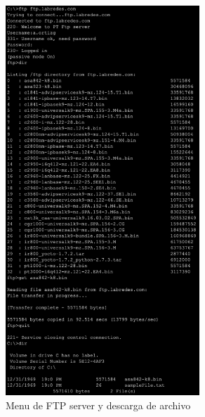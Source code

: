 \documentclass[10pt]{article}
\begin{document}
\begin{figure}[H]
    \centering
    \includegraphics[width=0.65\textwidth]{lab-01-screenshots/46-3-get-ftp}
    \caption{Menu de FTP server y descarga de archivo}
\end{figure}
\end{document}
